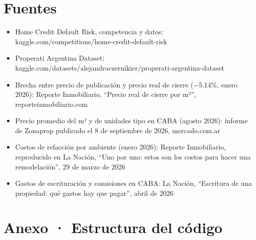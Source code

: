 \documentclass[11pt,a4paper]{article}
\begin{document}
\section*{Fuentes}

\begin{itemize}
\item
  Home Credit Default Risk, competencia y datos: kaggle.com/competitions/home-credit-default-risk
\item
  Properati Argentina Dataset: kaggle.com/datasets/alejandroczernikier/properati-argentina-dataset
\item
  Brecha entre precio de publicación y precio real de cierre (−5,14\%, enero 2026): Reporte Inmobiliario, ``Precio real de cierre por m²'', reporteinmobiliario.com
\item
  Precio promedio del m² y de unidades tipo en CABA (agosto 2026): informe de Zonaprop publicado el 8 de septiembre de 2026, mercado.com.ar
\item
  Costos de refacción por ambiente (enero 2026): Reporte Inmobiliario, reproducido en La Nación, ``Uno por uno: estos son los costos para hacer una remodelación'', 29 de marzo de 2026
\item
  Gastos de escrituración y comisiones en CABA: La Nación, ``Escritura de una propiedad: qué gastos hay que pagar'', abril de 2026
\end{itemize}

\section*{Anexo · Estructura del código}
\end{document}
